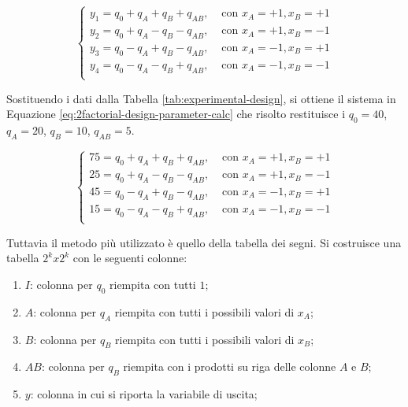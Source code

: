 \documentclass{article}
\begin{document}
\begin{equation}
  \begin{cases}
    y_1 = q_0 + q_A + q_B + q_{AB}, &\text{ con }x_A = +1, x_B = +1 \\
    y_2 = q_0 + q_A - q_B - q_{AB}, &\text{ con }x_A = +1, x_B = -1\\
    y_3 = q_0 - q_A + q_B - q_{AB}, &\text{ con }x_A = -1, x_B = +1\\
    y_4 = q_0 - q_A - q_B + q_{AB}, &\text{ con }x_A = -1, x_B = -1\\
  \end{cases}
  \label{eq:2factorial-design-parameters}
\end{equation}

Sostituendo i dati dalla Tabella \ref{tab:experimental-design}, si ottiene il sistema in 
Equazione \ref{eq:2factorial-design-parameter-calc} che risolto restituisce i 
$q_0 = 40$, $q_A = 20$, $q_B= 10$, $q_{AB} = 5$.

\begin{equation}
  \begin{cases}
    75 = q_0 + q_A + q_B + q_{AB}, &\text{ con }x_A = +1, x_B = +1 \\
    25 = q_0 + q_A - q_B - q_{AB}, &\text{ con }x_A = +1, x_B = -1\\
    45 = q_0 - q_A + q_B - q_{AB}, &\text{ con }x_A = -1, x_B = +1\\
    15 = q_0 - q_A - q_B + q_{AB}, &\text{ con }x_A = -1, x_B = -1\\
  \end{cases}
  \label{eq:2factorial-design-parameter-calc}
\end{equation}

Tuttavia il metodo più utilizzato è quello della tabella dei segni. Si costruisce una 
tabella $2^kx2^k$ con le seguenti colonne:
\begin{enumerate}
  \item $I$: colonna per $q_0$ riempita con tutti $1$;
  \item $A$: colonna per $q_A$ riempita con tutti i possibili valori di $x_A$;
  \item $B$: colonna per $q_B$ riempita con tutti i possibili valori di $x_B$;
  \item $AB$: colonna per $q_B$ riempita con i prodotti su riga delle colonne $A$ e $B$;
  \item $y$: colonna in cui si riporta la variabile di uscita;
\end{enumerate}
\end{document}
